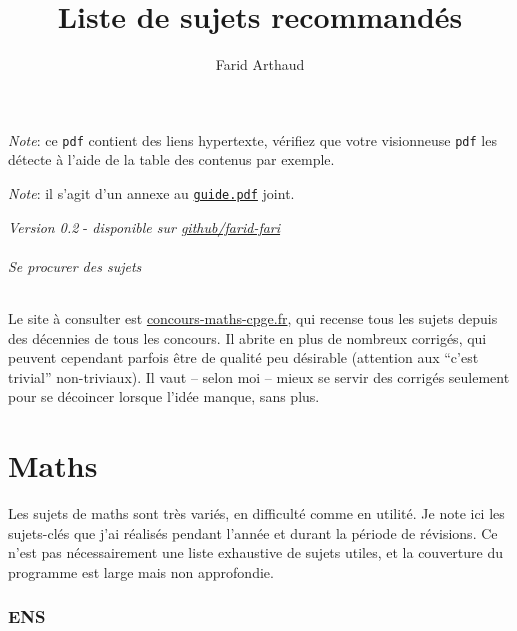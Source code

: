 \documentclass{article}
\begin{document}
\title{Liste de sujets recommandés}
\author{Farid Arthaud}
\maketitle
\tableofcontents

\vspace{1cm}

\textit{Note}: ce \texttt{pdf} contient des liens hypertexte, vérifiez que votre visionneuse \texttt{pdf} les détecte à l'aide de la table des contenus par exemple.

\textit{Note}: il s'agit d'un annexe au \href{guide.pdf}{\texttt{guide.pdf}} joint.

\textit{Version 0.2} - \textit{disponible sur \href{https://github.com/farid-fari/guideprepa}{github/farid-fari}}

\paragraph{Se procurer des sujets}\mbox{}\newline
Le site à consulter est \href{https://concours-maths-cpge.fr}{concours-maths-cpge.fr}, qui recense tous les sujets depuis des décennies de tous les concours.
Il abrite en plus de nombreux corrigés, qui peuvent cependant parfois être de qualité peu désirable (attention aux ``c'est trivial'' non-triviaux).
Il vaut -- selon moi -- mieux se servir des corrigés seulement pour se décoincer lorsque l'idée manque, sans plus.

\part{Maths}
Les sujets de maths sont très variés, en difficulté comme en utilité.
Je note ici les sujets-clés que j'ai réalisés pendant l'année et durant la période de révisions.
Ce n'est pas nécessairement une liste exhaustive de sujets utiles, et la couverture du programme est large mais non approfondie.

\section{ENS}
\end{document}
